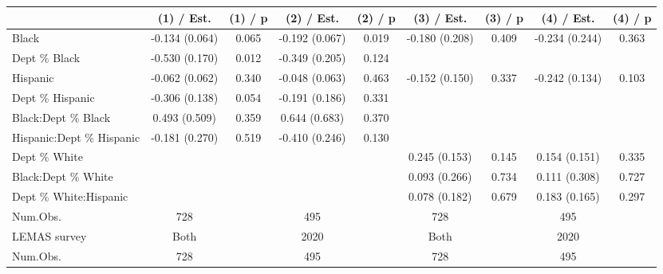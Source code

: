 
\begin{tabular}[t]{lcccccccc}
\toprule
  & (1) / Est. & (1) / p & (2) / Est. & (2) / p & (3) / Est. & (3) / p & (4) / Est. & (4) / p\\
\midrule
Black & -0.134 
(0.064) & 0.065 & -0.192 
(0.067) & 0.019 & -0.180 
(0.208) & 0.409 & -0.234 
(0.244) & 0.363\\
Dept \% Black & -0.530 
(0.170) & 0.012 & -0.349 
(0.205) & 0.124 &  &  &  & \\
Hispanic & -0.062 
(0.062) & 0.340 & -0.048 
(0.063) & 0.463 & -0.152 
(0.150) & 0.337 & -0.242 
(0.134) & 0.103\\
Dept \% Hispanic & -0.306 
(0.138) & 0.054 & -0.191 
(0.186) & 0.331 &  &  &  & \\
Black:Dept \% Black & 0.493 
(0.509) & 0.359 & 0.644 
(0.683) & 0.370 &  &  &  & \\
Hispanic:Dept \% Hispanic & -0.181 
(0.270) & 0.519 & -0.410 
(0.246) & 0.130 &  &  &  & \\
Dept \% White &  &  &  &  & 0.245 
(0.153) & 0.145 & 0.154 
(0.151) & 0.335\\
Black:Dept \% White &  &  &  &  & 0.093 
(0.266) & 0.734 & 0.111 
(0.308) & 0.727\\
Dept \% White:Hispanic &  &  &  &  & 0.078 
(0.182) & 0.679 & 0.183 
(0.165) & 0.297\\
\midrule
Num.Obs. & 728 &  & 495 &  & 728 &  & 495 \vphantom{1} & \\
LEMAS survey & Both &  & 2020 &  & Both &  & 2020 & \\
Num.Obs. & 728 &  & 495 &  & 728 &  & 495 & \\
\bottomrule
\end{tabular}
